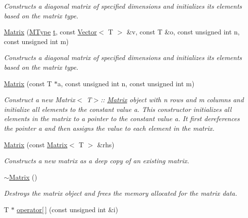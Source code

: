 \begin{DoxyCompactItemize}
\begin{DoxyCompactList}\small\item\em Constructs a diagonal matrix of specified dimensions and initializes its elements based on the matrix type. \end{DoxyCompactList}\item 
\mbox{\hyperlink{classMatrix_ab2f0cdfc1e7aac9ddd46a1c6b6a3f2f9}{Matrix}} (\mbox{\hyperlink{Array_8h_afb4b79601b9f07458ff37d2c507b3e6d}{M\+Type}} \mbox{\hyperlink{Array_8h_a182b5b431d17bd072b8384e4ad728cf3}{t}}, const \mbox{\hyperlink{classVector}{Vector}}$<$ T $>$ \&v, const T \&o, const unsigned int n, const unsigned int m)
\begin{DoxyCompactList}\small\item\em Constructs a diagonal matrix of specified dimensions and initializes its elements based on the matrix type. \end{DoxyCompactList}\item 
\mbox{\hyperlink{classMatrix_a33a507863c86bbc82e650054f1cc13b6}{Matrix}} (const T $\ast$a, const unsigned int n, const unsigned int m)
\begin{DoxyCompactList}\small\item\em Construct a new Matrix$<$ T$>$\+:\+: \mbox{\hyperlink{classMatrix}{Matrix}} object with {\ttfamily n} rows and {\ttfamily m} columns and initialize all elements to the constant value {\ttfamily a}. This constructor initializes all elements in the matrix to a pointer to the constant value {\ttfamily a}. It first dereferences the pointer {\ttfamily a} and then assigns the value to each element in the matrix. \end{DoxyCompactList}\item 
\mbox{\hyperlink{classMatrix_a6a46705243036bfeee78fe2c84c54340}{Matrix}} (const \mbox{\hyperlink{classMatrix}{Matrix}}$<$ T $>$ \&rhs)
\begin{DoxyCompactList}\small\item\em Constructs a new matrix as a deep copy of an existing matrix. \end{DoxyCompactList}\item 
\mbox{\hyperlink{classMatrix_a91aa704de674203e96aece9e1955ccd3}{$\sim$\+Matrix}} ()
\begin{DoxyCompactList}\small\item\em Destroys the matrix object and frees the memory allocated for the matrix data. \end{DoxyCompactList}\item 
T $\ast$ \mbox{\hyperlink{classMatrix_a771eff354da6c0008228dc19cde4142a}{operator\mbox{[}$\,$\mbox{]}}} (const unsigned int \&i)

\end{DoxyCompactItemize}
